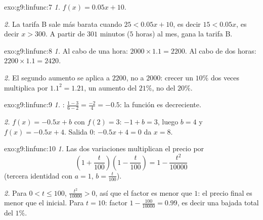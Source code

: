 \begin{solution}{exo:g9:linfunc:7}
\emph{1.} $f(x) = 0.05x + 10$.

\emph{2.} La tarifa B sale más barata cuando $25 < 0.05x + 10$, es decir
$15 < 0.05x$, es decir $x > 300$. A partir de $301$ minutos ($5$ horas) al mes,
gana la tarifa B.
\end{solution}

\begin{solution}{exo:g9:linfunc:8}
\emph{1.} Al cabo de una hora: $2000 \times 1.1 = 2200$. Al cabo de dos horas:
$2200 \times 1.1 = 2420$.

\emph{2.} El segundo aumento se aplica a $2200$, no a $2000$: crecer
un $10\%$ dos veces multiplica por $1.1^2 = 1.21$, un aumento del $21\%$, no del
$20\%$.
\end{solution}

\begin{solution}{exo:g9:linfunc:9}
\emph{1.} : $\frac{1 - 3}{6 - 2} = \frac{-2}{4} = -0.5$: la
función es decreciente.

\emph{2.} $f(x) = -0.5x + b$ con $f(2) = 3$: $-1 + b = 3$, luego $b = 4$
y $f(x) = -0.5x + 4$. Salida $0$: $-0.5x + 4 = 0$ da $x = 8$.
\end{solution}

\begin{solution}{exo:g9:linfunc:10}
\emph{1.} Las dos variaciones multiplican el precio por
\[
\left(1 + \frac{t}{100}\right)\left(1 - \frac{t}{100}\right)
= 1 - \frac{t^2}{10000}
\]
(tercera identidad con $a = 1$, $b = \frac{t}{100}$).

\emph{2.} Para $0 < t \leq 100$, $\frac{t^2}{10000} > 0$, así que el factor
es menor que $1$: el precio final es menor que el inicial. Para
$t = 10$: factor $1 - \frac{100}{10000} = 0.99$, es decir una bajada
total del $1\%$.
\end{solution}

